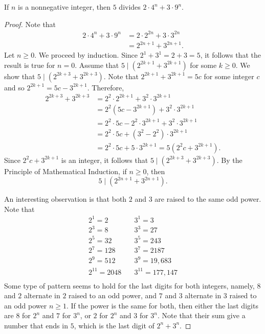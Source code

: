 \documentclass[12pt]{article}
\newenvironment{problem}[2][Problem]{\begin{trivlist}
		\item[\hskip \labelsep {\bfseries #1}\hskip \labelsep {\bfseries #2.}]}{\end{trivlist}}
\begin{document}
	\begin{problem}{10}
		If $n$ is a nonnegative integer, then $5$ divides $2\cdot 4^{n} + 3\cdot9^{n}$.
		\begin{proof}
			Note that 
			\begin{align*}
				2\cdot 4^{n} + 3\cdot9^{n} &= 2\cdot 2^{2n} + 3\cdot 3^{2n}\\
				 &= 2^{2n+1}+3^{2n+1}.
			\end{align*}
		Let $n\geq 0$. We proceed by induction. Since $2^{1} + 3^{1} = 2+3 = 5$, it follows that the result is true for $n=0$. Assume that $5\mid\left(2^{2k+1} + 3^{2k+1}\right)$ for some $k\geq 0$. We show that $5\mid\left(2^{2k+3} + 3^{2k+3}\right)$. Note that $2^{2k+1} + 3^{2k+1} = 5c$ for some integer $c$ and so $2^{2k+1} = 5c-3^{2k+1}$. Therefore,
		\begin{align*}
			2^{2k+3} + 3^{2k+3} &= 2^{2}\cdot 2^{2k+1} + 3^{2}\cdot 3^{2k+1}\\
			&= 2^{2}\left(5c-3^{2k+1}\right) + 3^{2}\cdot 3^{2k+1}\\
			&= 2^{2}\cdot 5c -2^{2}\cdot 3^{2k+1}+3^{2}\cdot 3^{2k+1}\\
			&= 2^{2}\cdot 5c + (3^{2}-2^{2})\cdot 3^{2k+1} \\
			&= 2^{2}\cdot 5c + 5\cdot 3^{2k+1} = 5\left(2^{2}c +3^{2k+1}\right).
		\end{align*} 
	Since $2^{2}c +3^{2k+1}$ is an integer, it follows that $5\mid \left(2^{2k+3} + 3^{2k+3}\right)$. By the Principle of Mathematical Induction, if $n\geq 0$, then
	\begin{equation*}
		5\mid \left(2^{2n+1}+3^{2n+1}\right).
	\end{equation*}

	An interesting observation is that both $2$ and $3$ are raised to the same odd power. Note that
\begin{align*}
		2^{1} = 2 &\quad 3^{1} = 3\\ 
		2^{3} = 8 &\quad 3^{3} = 27\\
		2^{5} = 32 &\quad 3^{5} = 243\\
		2^{7} = 128 &\quad 3^{7} = 2187\\
		2^{9} = 512 &\quad 3^{9} = 19,683\\
		2^{11} = 2048 &\quad 3^{11} = 177,147\\
\end{align*}
Some type of pattern seems to hold for the last digits for both integers, namely, $8$ and $2$ alternate in $2$ raised to an odd power, and $7$ and $3$ alternate in $3$ raised to an odd power $n\geq 1$. If the power is the same for both, then either the last digits are $8$ for $2^{n}$ and $7$ for $3^{n}$, or $2$ for  $2^{n}$ and $3$ for $3^{n}$. Note that their sum give a number that ends in $5$, which is the last digit of $2^{n} + 3^{n}$.
		\end{proof}
	\end{problem}
\end{document}
